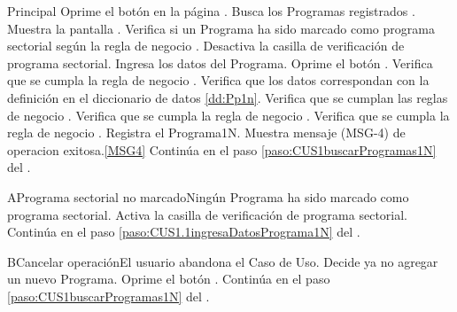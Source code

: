	\begin{UCtrayectoria}{Principal}
		\UCpaso[\UCactor] Oprime el bot\'on  en la p\'agina .
		\UCpaso Busca los Programas registrados \label{paso:CUS1.1buscaProgramas1N}.
		\UCpaso Muestra la pantalla .
		\UCpaso Verifica si un Programa ha sido marcado como programa sectorial según la regla de negocio .
		\UCpaso Desactiva la casilla de verificaci\'on de programa sectorial. 
		\UCpaso [\UCactor] Ingresa los datos del Programa.\label{paso:CUS1.1ingresaDatosPrograma1N} 
		\UCpaso [\UCactor] Oprime el bot\'on .
		\UCpaso Verifica que se cumpla la regla de negocio .
		\UCpaso Verifica que los datos correspondan con la definici\'on en el diccionario de datos \ref{dd:Pp1n}. 
		\UCpaso Verifica que se cumplan las reglas de negocio . 
		\UCpaso Verifica que se cumpla la regla de negocio .  
		\UCpaso Verifica que se cumpla la regla de negocio .  
		\UCpaso Registra el Programa1N.
                \UCpaso Muestra mensaje (MSG-4) de operacion exitosa.\ref{MSG4}
		\UCpaso Contin\'ua en el paso \ref{paso:CUS1buscarProgramas1N} del .
	\end{UCtrayectoria}

	\begin{UCtrayectoriaA}{A}{Programa sectorial no marcado}{Ning\'un Programa ha sido marcado como programa sectorial.}
		\UCpaso Activa la casilla de verificaci\'on de programa sectorial.
		\UCpaso Contin\'ua en el paso \ref{paso:CUS1.1ingresaDatosPrograma1N} del .
	\end{UCtrayectoriaA}
	
	\begin{UCtrayectoriaA}{B}{Cancelar operaci\'on}{El usuario abandona el Caso de Uso.}
		\UCpaso[\UCactor] Decide ya no agregar un nuevo Programa.
		\UCpaso[\UCactor] Oprime el bot\'on .
			\UCpaso Contin\'ua en el paso \ref{paso:CUS1buscarProgramas1N} del .
	\end{UCtrayectoriaA}

